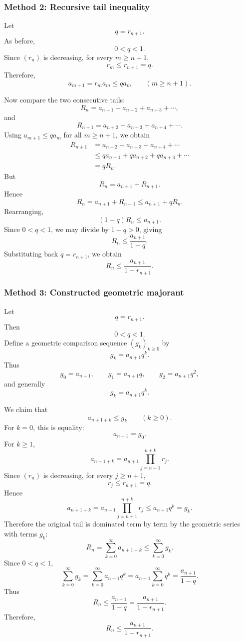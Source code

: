 \documentclass[12pt]{article}
\begin{document}
\newpage
\subsubsection*{Method 2: Recursive tail inequality}

Let
\[
q=r_{n+1}.
\]
As before,
\[
0<q<1.
\]
Since \((r_n)\) is decreasing, for every \(m\ge n+1\),
\[
r_m\le r_{n+1}=q.
\]
Therefore,
\[
a_{m+1}=r_m a_m\le q a_m
\qquad (m\ge n+1).
\]

Now compare the two consecutive tails:
\[
R_n=a_{n+1}+a_{n+2}+a_{n+3}+\cdots,
\]
and
\[
R_{n+1}=a_{n+2}+a_{n+3}+a_{n+4}+\cdots.
\]
Using \(a_{m+1}\le q a_m\) for all \(m\ge n+1\), we obtain
\begin{align*}
R_{n+1}
&=
a_{n+2}+a_{n+3}+a_{n+4}+\cdots\\
&\le
q a_{n+1}+q a_{n+2}+q a_{n+3}+\cdots\\
&=
qR_n.
\end{align*}
But
\[
R_n=a_{n+1}+R_{n+1}.
\]
Hence
\[
R_n
=
a_{n+1}+R_{n+1}
\le
a_{n+1}+qR_n.
\]
Rearranging,
\[
(1-q)R_n\le a_{n+1}.
\]
Since \(0<q<1\), we may divide by \(1-q>0\), giving
\[
R_n\le \frac{a_{n+1}}{1-q}.
\]
Substituting back \(q=r_{n+1}\), we obtain
\[
\boxed{
R_n\le \frac{a_{n+1}}{1-r_{n+1}}.
}
\]

\newpage
\subsubsection*{Method 3: Constructed geometric majorant}

Let
\[
q=r_{n+1}.
\]
Then
\[
0<q<1.
\]
Define a geometric comparison sequence \((g_k)_{k\ge 0}\) by
\[
g_k=a_{n+1}q^k.
\]
Thus
\[
g_0=a_{n+1},\qquad
g_1=a_{n+1}q,\qquad
g_2=a_{n+1}q^2,
\]
and generally
\[
g_k=a_{n+1}q^k.
\]

We claim that
\[
a_{n+1+k}\le g_k
\qquad(k\ge 0).
\]
For \(k=0\), this is equality:
\[
a_{n+1}=g_0.
\]
For \(k\ge 1\),
\[
a_{n+1+k}
=
a_{n+1}\prod_{j=n+1}^{n+k}r_j.
\]
Since \((r_n)\) is decreasing, for every \(j\ge n+1\),
\[
r_j\le r_{n+1}=q.
\]
Hence
\[
a_{n+1+k}
=
a_{n+1}\prod_{j=n+1}^{n+k}r_j
\le
a_{n+1}q^k
=
g_k.
\]
Therefore the original tail is dominated term by term by the geometric series with terms \(g_k\):
\[
R_n
=
\sum_{k=0}^{\infty}a_{n+1+k}
\le
\sum_{k=0}^{\infty}g_k.
\]
Since \(0<q<1\),
\[
\sum_{k=0}^{\infty}g_k
=
\sum_{k=0}^{\infty}a_{n+1}q^k
=
a_{n+1}\sum_{k=0}^{\infty}q^k
=
\frac{a_{n+1}}{1-q}.
\]
Thus
\[
R_n
\le
\frac{a_{n+1}}{1-q}
=
\frac{a_{n+1}}{1-r_{n+1}}.
\]
Therefore,
\[
\boxed{
R_n\le \frac{a_{n+1}}{1-r_{n+1}}.
}
\]
\end{document}
